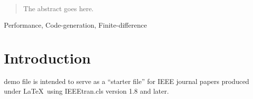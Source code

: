 \documentclass[journal]{IEEEtran}
\begin{document}





\maketitle

\begin{abstract}
The abstract goes here.
\end{abstract}

\begin{IEEEkeywords}
Performance, Code-generation, Finite-difference
\end{IEEEkeywords}



%
\IEEEpeerreviewmaketitle



\section{Introduction}
% 
% 
% 
% 
 demo file is intended to serve as a ``starter file''
for IEEE journal papers produced under \LaTeX\ using
IEEEtran.cls version 1.8 and later.
\end{document}
